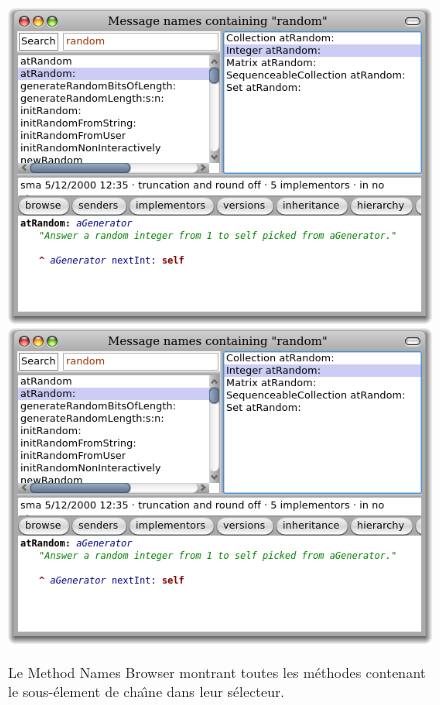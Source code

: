 \documentclass[a4paper,10pt,twoside]{book}
\begin{document}
\begin{figure}[btp]
	\begin{center}
	\ifluluelse
		{\includegraphics[width=\textwidth]{methodNamesRandom}}
		{\includegraphics[scale=0.7]{methodNamesRandom}}
	\end{center}
	\caption{Le Method Names Browser montrant toutes les m\'ethodes contenant le sous-\'element de cha\^{\i}ne  dans leur s\'electeur.}
	\label{fig:methodNamesRandom}
\end{figure}

\end{document}
